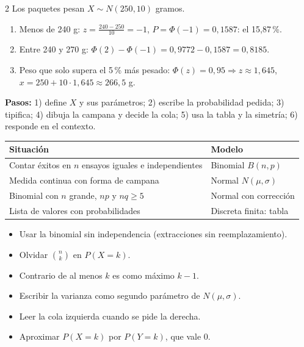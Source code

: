 \documentclass[10pt]{article}
\begin{document}
\begin{multicols}{2}
Los paquetes pesan \(X\sim N(250,10)\) gramos.
\begin{enumerate}
  \item Menos de 240 g: \(z=\frac{240-250}{10}=-1\), \(P=\Phi(-1)=0{,}1587\): el 15,87\,\%.
  \item Entre 240 y 270 g: \(\Phi(2)-\Phi(-1)=0{,}9772-0{,}1587=0{,}8185\).
  \item Peso que solo supera el 5\,\% más pesado: \(\Phi(z)=0{,}95\Rightarrow z\approx1{,}645\), \(x=250+10\cdot1{,}645\approx266{,}5\) g.
\end{enumerate}
\textbf{Pasos:} 1) define \(X\) y sus parámetros; 2) escribe la probabilidad pedida; 3) tipifica; 4) dibuja la campana y decide la cola; 5) usa la tabla y la simetría; 6) responde en el contexto.

\begin{tabular}{@{}p{3.6cm}p{4.2cm}@{}}
\textbf{Situación} & \textbf{Modelo}\\ \hline
Contar éxitos en \(n\) ensayos iguales e independientes & Binomial \(B(n,p)\)\\
Medida continua con forma de campana & Normal \(N(\mu,\sigma)\)\\
Binomial con \(n\) grande, \(np\) y \(nq\ge5\) & Normal con corrección\\
Lista de valores con probabilidades & Discreta finita: tabla
\end{tabular}

\begin{ojo}
\begin{itemize}
  \item Usar la binomial sin independencia (extracciones sin reemplazamiento).
  \item Olvidar \(\binom nk\) en \(P(X=k)\).
  \item Contrario de \guillemotleft{}al menos \(k\)\guillemotright{} es \guillemotleft{}como máximo \(k-1\)\guillemotright{}.
  \item Escribir la varianza como segundo parámetro de \(N(\mu,\sigma)\).
  \item Leer la cola izquierda cuando se pide la derecha.
  \item Aproximar \(P(X=k)\) por \(P(Y=k)\), que vale 0.
\end{itemize}
\end{ojo}

\end{multicols}
\end{document}
